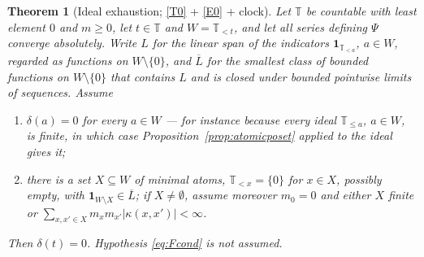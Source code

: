\documentclass[11pt,a4paper]{article}
\theoremstyle{plain}
\newtheorem{theorem}{Theorem}[section]
\theoremstyle{definition}
\theoremstyle{remark}
\newcommand{\T}{\mathbb{T}}                     %
\newcommand{\one}{\mathbf{1}}
\begin{document}
\begin{theorem}[Ideal exhaustion; \eqref{T0} + \eqref{E0} + clock]
  \label{thm:idealexhaustion}
  Let $\T$ be countable with least element $0$ and $m \geq 0$, let $t \in \T$
  and $W = \T_{<t}$, and let all series defining $\Psi$ converge absolutely.
  Write $L$ for the linear span of the indicators $\one_{\T_{<a}}$, $a \in W$,
  regarded as functions on $W \setminus \{0\}$, and $\overline{L}$ for the
  smallest class of bounded functions on $W \setminus \{0\}$ that contains $L$
  and is closed under bounded pointwise limits of sequences.  Assume
  \begin{enumerate}[label=(\roman*)]
  \item $\delta(a) = 0$ for every $a \in W$ --- for instance because every
    ideal $\T_{\leq a}$, $a \in W$, is finite, in which case
    Proposition~\ref{prop:atomicposet} applied to the ideal gives it;
  \item there is a set $X \subseteq W$ of minimal atoms, $\T_{<x} = \{0\}$ for
    $x \in X$, possibly empty, with $\one_{W \setminus X} \in \overline{L}$;
    if $X \neq \emptyset$, assume moreover $m_0 = 0$ and either $X$ finite or
    $\sum_{x,x' \in X} m_x m_{x'} \lvert\kappa(x,x')\rvert < \infty$.
  \end{enumerate}
  Then $\delta(t) = 0$.  Hypothesis \eqref{eq:Fcond} is not assumed.
\end{theorem}
\end{document}
